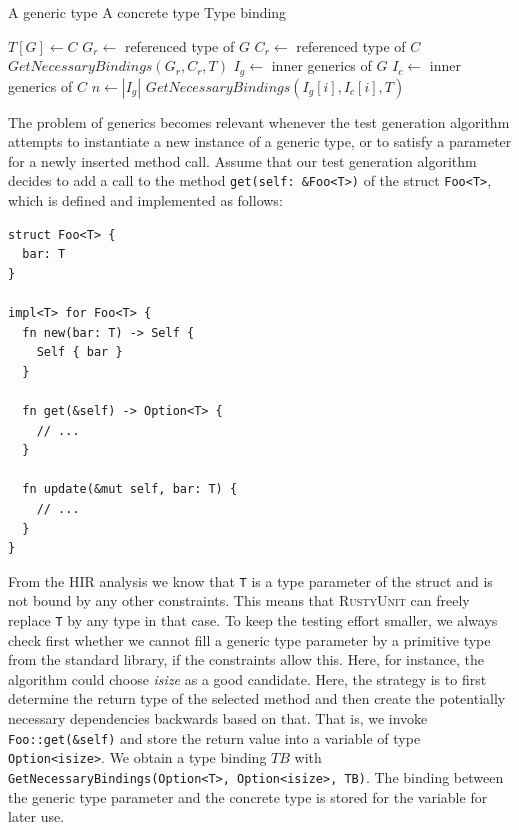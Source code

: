 \documentclass[paper=a4,%
  twoside,%
  BCOR4mm,%
  abstract=true,%
  toc=bibliography,%
  chapterprefix=true,%
  toc=bibliographynumbered,%
  open=right,%
  english,%
  pagesize=pdftex]{scrreprt}
\newcommand{\Desc}[2]{\State \makebox[2em][l]{#1}#2}
\newcommand{\tech}{\textsc{RustyUnit}\xspace}
\newcommand{\hir}{\ac{HIR}\xspace}
\begin{document}
\begin{algorithm}[t]
  \caption{$GetNecessaryBindings(G, C, T)$}\label{alg:get-necessary-bindings}
\begin{algorithmic}
\Input
  \Desc{$G$}{A generic type}
  \Desc{$C$}{A concrete type}
  \Desc{$T$}{Type binding}
\EndInput

\State $T[G] \gets C$
\Else
    \State $G_r \gets $ referenced type of $G$
    \State $C_r \gets $ referenced type of $C$
    \State $GetNecessaryBindings(G_r, C_r, T)$
  \Else
    \State $I_g \gets $ inner generics of $G$
    \State $I_c \gets $ inner generics of $C$
    \State $n \gets \left| I_g \right|$
      \State $GetNecessaryBindings(I_g[i], I_c[i], T)$
    \EndFor
  \EndIf
\EndIf
\end{algorithmic}
\end{algorithm}

The problem of generics becomes relevant whenever the test generation algorithm attempts to instantiate a new instance of a generic type, or to satisfy a parameter for a newly inserted method call. Assume that our test generation algorithm decides to add a call to the method \texttt{get(self: \&Foo<T>)} of the struct \texttt{Foo<T>}, which is defined and implemented as follows:
\begin{lstlisting}[style=boxed, caption={}, label=lst:basic-generics-example]
struct Foo<T> {
  bar: T
}

impl<T> for Foo<T> {
  fn new(bar: T) -> Self {
    Self { bar }
  }

  fn get(&self) -> Option<T> {
    // ...
  }

  fn update(&mut self, bar: T) {
    // ...
  }
}
\end{lstlisting}

From the \hir analysis we know that \texttt{T} is a type parameter of the struct and is not bound by any other constraints. This means that \tech can freely replace \texttt{T} by any type in that case. To keep the testing effort smaller, we always check first whether we cannot fill a generic type parameter by a primitive type from the standard library, if the constraints allow this. Here, for instance, the algorithm could choose \emph{isize} as a good candidate. Here, the strategy is to first determine the return type of the selected method and then create the potentially necessary dependencies backwards based on that. That is, we invoke \texttt{Foo::get(\&self)} and store the return value into a variable of type \texttt{Option<isize>}. We obtain a type binding $TB$ with \texttt{GetNecessaryBindings(Option<T>, Option<isize>, TB)}. The binding \texttt{} between the generic type parameter and the concrete type is stored for the variable for later use.
\end{document}

